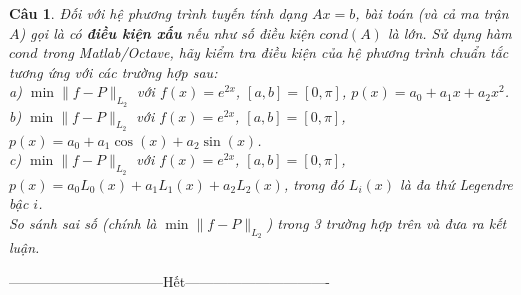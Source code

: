 \documentclass[11pt]{article}
\newtheorem{bt}{Câu}
\begin{document}
\begin{bt} Đối với hệ phương trình tuyến tính dạng $Ax=b$, bài toán (và cả ma trận $A$) gọi là có \textbf{điều kiện xấu} nếu như số điều kiện $cond(A)$ là lớn. Sử dụng hàm $cond$ trong Matlab/Octave, hãy kiểm tra điều kiện của hệ phương trình chuẩn tắc tương ứng với các trường hợp sau:\\
a) $\min \|f-P\|_{L_2}$ với $f(x)=e^{2x}$, $[a,b]=[0,\pi]$, $p(x)=a_0 + a_1 x + a_2 x^2 $.	 \\
b) $\min \|f-P\|_{L_2}$ với $f(x)=e^{2x}$, $[a,b]=[0,\pi]$, $p(x)=a_0 + a_1 \cos(x) + a_2 \sin(x) $. \\
c) $\min \|f-P\|_{L_2}$ với $f(x)=e^{2x}$, $[a,b]=[0,\pi]$, $p(x)=a_0 L_0(x) + a_1 L_1(x) + a_2 L_2(x)$, trong đó $L_i(x)$ là đa thứ Legendre bậc $i$.\\
So sánh sai số (chính là $\min \|f-P\|_{L_2}$) trong 3 trường hợp trên và đưa ra kết luận.
\end{bt}


\centerline{———————————Hết——————————-}
\end{document}
